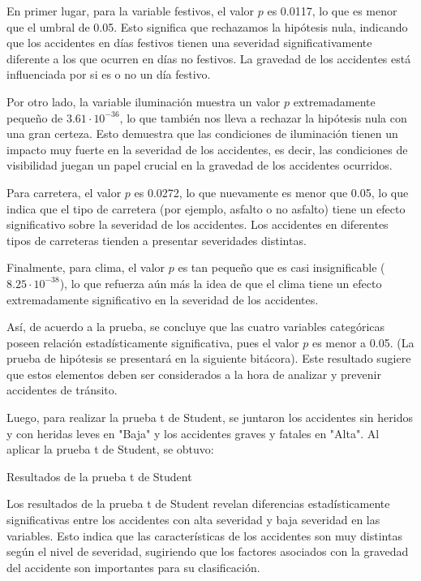\documentclass{book}
\begin{document}
En primer lugar, para la variable festivos, el valor \( p \) es 0.0117, lo que es menor que el umbral de 0.05. Esto significa que rechazamos la hipótesis nula, indicando que los accidentes en días festivos tienen una severidad significativamente diferente a los que ocurren en días no festivos. La gravedad de los accidentes está influenciada por si es o no un día festivo.

Por otro lado, la variable iluminación muestra un valor \( p \) extremadamente pequeño de \( 3.61 \cdot 10^{-36} \), lo que también nos lleva a rechazar la hipótesis nula con una gran certeza. Esto demuestra que las condiciones de iluminación tienen un impacto muy fuerte en la severidad de los accidentes, es decir, las condiciones de visibilidad juegan un papel crucial en la gravedad de los accidentes ocurridos.

Para carretera, el valor \( p \) es 0.0272, lo que nuevamente es menor que 0.05, lo que indica que el tipo de carretera (por ejemplo, asfalto o no asfalto) tiene un efecto significativo sobre la severidad de los accidentes. Los accidentes en diferentes tipos de carreteras tienden a presentar severidades distintas.

Finalmente, para clima, el valor \( p \) es tan pequeño que es casi insignificable (\( 8.25 \cdot 10^{-38} \)), lo que refuerza aún más la idea de que el clima tiene un efecto extremadamente significativo en la severidad de los accidentes.

Así, de acuerdo a la prueba, se concluye que las cuatro variables categóricas poseen relación estadísticamente significativa, pues el valor \( p \) es menor a 0.05. (La prueba de hipótesis se presentará en la siguiente bitácora). Este resultado sugiere que estos elementos deben ser considerados a la hora de analizar y prevenir accidentes de tránsito.

Luego, para realizar la prueba t de Student, se juntaron los accidentes sin heridos y con heridas leves en "Baja" y los accidentes graves y fatales en "Alta". Al aplicar la prueba t de Student, se obtuvo:

\begin{table}[H]
\centering

\caption{Resultados de la prueba t de Student}
\end{table}

Los resultados de la prueba t de Student revelan diferencias estadísticamente significativas entre los accidentes con alta severidad y baja severidad en las variables. Esto indica que las características de los accidentes son muy distintas según el nivel de severidad, sugiriendo que los factores asociados con la gravedad del accidente son importantes para su clasificación.
\end{document}
